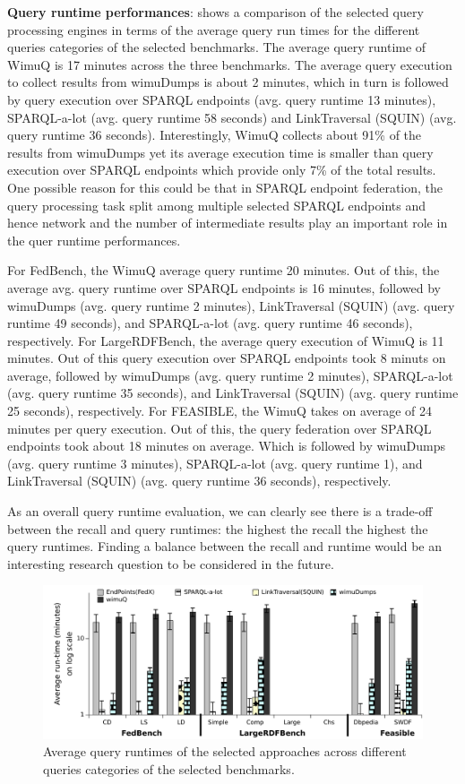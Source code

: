 \documentclass[sw]{iosart2x}
\begin{document}
\textbf{Query runtime performances}: 
 shows a comparison of the selected query processing engines in terms of the average query run times for the different queries categories of the selected benchmarks. The average query runtime of WimuQ is 17 minutes across the three benchmarks. The average query execution to collect results from wimuDumps is about 2 minutes, which in turn is followed by query execution over SPARQL endpoints (avg. query runtime 13 minutes), SPARQL-a-lot (avg. query runtime 58 seconds) and LinkTraversal (SQUIN) (avg. query runtime 36 seconds). Interestingly, WimuQ collects about 91\% of the results from wimuDumps yet its average execution time is smaller than query execution over SPARQL endpoints which provide only 7\%  of the total results. One possible reason for this could be that in SPARQL endpoint federation, the query processing task split among multiple selected SPARQL endpoints and hence network and the number of intermediate results play an important role in the quer runtime performances. 

For FedBench, the WimuQ average query runtime 20 minutes. Out of this, the average avg. query runtime over SPARQL endpoints is 16 minutes, followed by wimuDumps (avg. query runtime 2 minutes), LinkTraversal (SQUIN) (avg. query runtime 49 seconds), and SPARQL-a-lot (avg. query runtime 46 seconds), respectively. For LargeRDFBench, the average query execution of WimuQ is 11 minutes. Out of this query execution over SPARQL endpoints took 8 minuts on average, followed by wimuDumps (avg. query runtime 2 minutes), SPARQL-a-lot (avg. query runtime 35 seconds), and LinkTraversal (SQUIN) (avg. query runtime 25 seconds), respectively. For FEASIBLE, the WimuQ takes on average of 24 minutes per query execution. Out of this, the query federation over SPARQL endpoints took about 18 minutes on average. Which is followed by wimuDumps (avg. query runtime 3 minutes), SPARQL-a-lot (avg. query runtime 1), and LinkTraversal (SQUIN) (avg. query runtime 36 seconds), respectively.

As an overall query runtime evaluation, we can clearly see there is a trade-off between the recall and query runtimes: the highest the recall the highest the query runtimes. Finding a balance between the recall and runtime would be an interesting research question to be considered in the future.  

\begin{figure}[htb]
    \includegraphics[width=\textwidth]{img/runtime1Min.pdf}
	\caption{Average query runtimes of the selected approaches across different queries categories of the selected benchmarks.}
	\label{fig:runtime1}
\end{figure}
\end{document}
